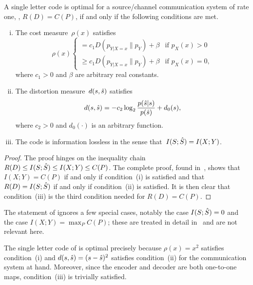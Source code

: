 \begin{theorem}
  \label{thm:tcntcbwmatch}
  A single letter code is optimal for a source/channel communication system of
  rate one, \ie, $R(D) = C(P)$, if and only if the following conditions are
  met.
  \begin{enumerate}[(i)]
    \item The cost measure~$\rho(x)$ satisfies
      \begin{equation}
        \label{eq:optcost}
        \rho(x)
        \begin{cases}
          = c_1 D(p_{Y|X=x} \| p_Y) + \beta & \text{if $p_X(x) > 0$} \\
          \ge c_1 D(p_{Y|X=x} \| p_Y) + \beta & \text{if $p_X(x) = 0$},
        \end{cases}
      \end{equation}
      where $c_1 > 0$ and $\beta$ are arbitrary real constants.

    \item The distortion measure~$d(s,{\hat{s}})$ satisfies
      \begin{equation}
        \label{eq:optdist}
        d(s,{\hat{s}}) = - c_2 \log_2 \frac{p({\hat{s}}|s)}{p({\hat{s}})} + d_0(s),
      \end{equation}
      where $c_2 > 0$ and $d_0(\cdot)$ is an arbitrary function.

    \item The code is information lossless in the sense that~$I(S;{\hat{S}}) =
      I(X;Y)$.
  \end{enumerate}
\end{theorem}

\begin{proof}
  The proof hinges on the inequality chain $R(D) \le I(S;{\hat{S}}) \le I(X;Y) \le
  C(P)$. The complete proof, found in~\cite{GastparRV2003}, shows that $I(X;Y) =
  C(P)$ if and only if condition~(i) is satisfied and that $R(D) = I(S;{\hat{S}})$ if
  and only if condition~(ii) is satisfied. It is then clear that condition~(iii)
  is the third condition needed for $R(D) = C(P)$.
\end{proof}

\begin{remark}
  \label{rem:tcntcrug}
  The statement of  ignores a few special cases,
  notably the case $I(S;{\hat{S}}) = 0$ and the case $I(X;Y) = \max_P C(P)$; these are
  treated in detail in~\cite{GastparRV2003} and are not relevant here.
\end{remark}

The single letter code of  is optimal precisely because
$\rho(x) = x^2$ satisfies condition~(i) and $d(s,{\hat{s}}) = (s - {\hat{s}})^2$ satisfies
condition~(ii) for the communication system at hand. Moreover, since the encoder
and decoder are both one-to-one maps, condition~(iii) is trivially satisfied.

